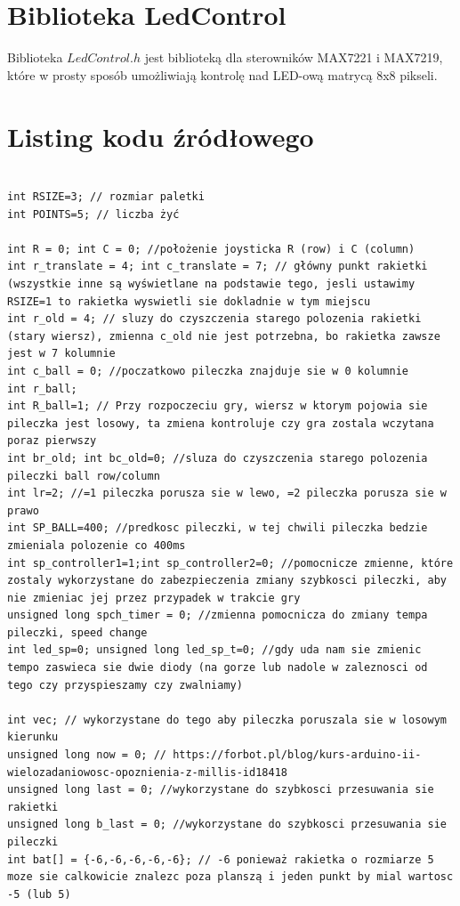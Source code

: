 \documentclass[12pt,notitlepage]{article}
\begin{document}
\section{Biblioteka LedControl}
Biblioteka $LedControl.h$ jest biblioteką dla sterowników MAX7221 i MAX7219, które w prosty sposób umożliwiają kontrolę nad LED-ową matrycą 8x8 pikseli.
\newpage
\section{Listing kodu źródłowego}

\begin{lstlisting}[style=CStyle]

int RSIZE=3; // rozmiar paletki
int POINTS=5; // liczba żyć

int R = 0; int C = 0; //położenie joysticka R (row) i C (column)
int r_translate = 4; int c_translate = 7; // główny punkt rakietki (wszystkie inne są wyświetlane na podstawie tego, jesli ustawimy RSIZE=1 to rakietka wyswietli sie dokladnie w tym miejscu
int r_old = 4; // sluzy do czyszczenia starego polozenia rakietki (stary wiersz), zmienna c_old nie jest potrzebna, bo rakietka zawsze jest w 7 kolumnie
int c_ball = 0; //poczatkowo pileczka znajduje sie w 0 kolumnie
int r_ball; 
int R_ball=1; // Przy rozpoczeciu gry, wiersz w ktorym pojowia sie pileczka jest losowy, ta zmiena kontroluje czy gra zostala wczytana poraz pierwszy 
int br_old; int bc_old=0; //sluza do czyszczenia starego polozenia pileczki ball row/column
int lr=2; //=1 pileczka porusza sie w lewo, =2 pileczka porusza sie w prawo
int SP_BALL=400; //predkosc pileczki, w tej chwili pileczka bedzie zmieniala polozenie co 400ms
int sp_controller1=1;int sp_controller2=0; //pomocnicze zmienne, które zostaly wykorzystane do zabezpieczenia zmiany szybkosci pileczki, aby nie zmieniac jej przez przypadek w trakcie gry
unsigned long spch_timer = 0; //zmienna pomocnicza do zmiany tempa pileczki, speed change
int led_sp=0; unsigned long led_sp_t=0; //gdy uda nam sie zmienic tempo zaswieca sie dwie diody (na gorze lub nadole w zaleznosci od tego czy przyspieszamy czy zwalniamy)

int vec; // wykorzystane do tego aby pileczka poruszala sie w losowym kierunku
unsigned long now = 0; // https://forbot.pl/blog/kurs-arduino-ii-wielozadaniowosc-opoznienia-z-millis-id18418
unsigned long last = 0; //wykorzystane do szybkosci przesuwania sie rakietki
unsigned long b_last = 0; //wykorzystane do szybkosci przesuwania sie pileczki
int bat[] = {-6,-6,-6,-6,-6}; // -6 ponieważ rakietka o rozmiarze 5 moze sie calkowicie znalezc poza planszą i jeden punkt by mial wartosc -5 (lub 5)


\end{lstlisting}
\end{document}
